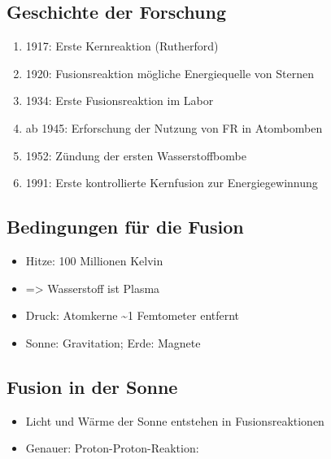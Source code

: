 \documentclass[10pt,a4paper, ngerman]{beamer}
\begin{document}
\subsection{Geschichte der Forschung}
\begin{frame}{\subsecname}{\secname}
\begin{enumerate}
\item 1917: Erste Kernreaktion (Rutherford)

\item 1920: Fusionsreaktion mögliche Energiequelle von Sternen

\item 1934: Erste Fusionsreaktion im Labor

\item ab 1945: Erforschung der Nutzung von FR in Atombomben

\item 1952: Zündung der ersten Wasserstoffbombe

\item 1991: Erste kontrollierte Kernfusion zur Energiegewinnung
\end{enumerate}
\end{frame}

\subsection{Bedingungen für die Fusion}
\begin{frame}{\subsecname}{\secname}
\begin{itemize}
\item Hitze: 100 Millionen Kelvin
\item => Wasserstoff ist Plasma
\item Druck: Atomkerne \textasciitilde1 Femtometer entfernt
\item Sonne: Gravitation; Erde: Magnete
\end{itemize}
\end{frame}


\subsection{Fusion in der Sonne}
\begin{frame}{\subsecname}{\secname}
\begin{itemize}
\item Licht und Wärme der Sonne entstehen in Fusionsreaktionen \pause
\item Genauer: Proton-Proton-Reaktion:
\end{itemize}
\end{frame}
\end{document}
